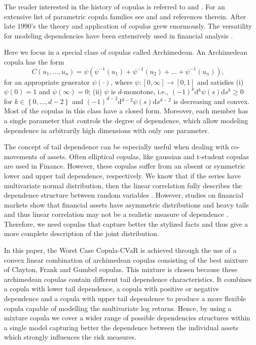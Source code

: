\documentclass[a4paper,10pt]{article}
\begin{document}
The reader interested in the history of copulas is referred to \citet*{%
	schweizer2011} and \citet*{nelsen06}. For an extensive list of parametric
copula families see \citet*{joe97} and \citet*{nelsen06} and references
therein. After late 1990's the theory and application of copulas grew
enormously. The versatility for modeling dependencies have been extensively used in financial analysis \citep{cherubini04,patton2006,chan2010,sak2010,laih2014,d2017copula}. 

Here we focus in a special class of copulas called Archimedean. An
Archimedean copula has the form
\begin{equation}
C\left( u_{1},...,u_{n}\right) =\psi \left( \psi ^{-1}\left( u_{1}\right)
+\psi ^{-1}\left( u_{2}\right) +...+\psi ^{-1}\left( u_{n}\right) \right) ,
\end{equation}%
for an appropriate generator $\psi \left( \cdot \right) $, where $\psi :%
\left[ 0,\infty \right] \rightarrow \left[ 0,1\right] $ and satisfies (i) $%
\psi (0)=1$ and $\psi (\infty )=0$; (ii) $\psi $ is $d$-monotone, i.e., $%
(-1)^{k}$d$^{k}\psi \left( s\right) $d$s^{k}\geq 0$ for $k\in \left\{
0,...,d-2\right\} $ and $(-1)^{d-2}$d$^{d-2}\psi \left( s\right) $d$s^{d-2}$
is decreasing and convex. Most of the copulas in this class have a closed
form. Moreover, each member has a single parameter that controls the degree
of dependence, which allow modeling dependence in arbitrarily high
dimensions with only one parameter.

The concept of tail dependence can be especially useful when dealing with co-movements of assets. Often elliptical copulas, like gaussian and t-student copulas are used in Finance. However, these copulas suffer from an absent or symmetric lower and upper tail dependence, respectively. We know that if the series have multivariate normal distribution, then the linear correlation fully describes the dependence structure between random variables \citep{embrechts2001}. However, studies on financial markets show that financial assets have asymmetric distributions and heavy tails and thus linear correlation may not be a realistic measure of dependence \citep{campbell97,artzner1999,cont01,ane03,szego2005,mcneil15}. Therefore, we need copulas that capture better the
stylized facts and thus give a more complete description of the joint
distribution.

In this paper, the Worst Case Copula-CVaR is achieved through the use of a
convex linear combination of archimedean copulas consisting of the best
mixture of Clayton, Frank and Gumbel copulas. This mixture is chosen because
these archimedean copulas contain different tail dependence characteristics.
It combines a copula with lower tail dependence, a copula with positive or
negative dependence and a copula with upper tail dependence to produce a
more flexible copula capable of modelling the multivariate log returns.
Hence, by using a mixture copula we cover a wider range of possible
dependencies structures within a single model capturing better the
dependence between the individual assets which strongly influences the risk
measures.
\end{document}
